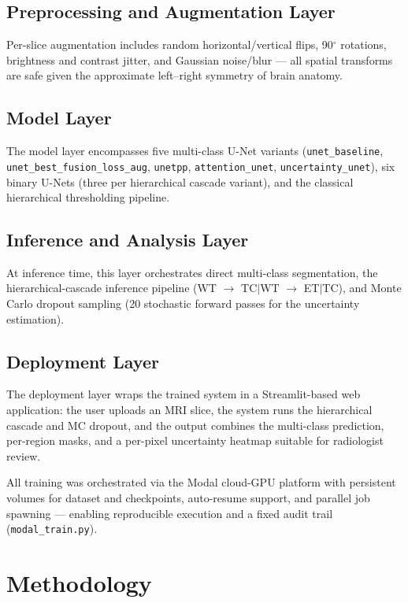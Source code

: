 \documentclass[conference]{IEEEtran}
\begin{document}
\subsection{Preprocessing and Augmentation Layer}
Per-slice augmentation includes random horizontal/vertical flips,
90$^\circ$ rotations, brightness and contrast jitter, and Gaussian
noise/blur --- all spatial transforms are safe given the approximate
left--right symmetry of brain anatomy.

\subsection{Model Layer}
The model layer encompasses five multi-class U-Net variants
(\texttt{unet\_baseline}, \texttt{unet\_best\_fusion\_loss\_aug},
\texttt{unetpp}, \texttt{attention\_unet}, \texttt{uncertainty\_unet}),
six binary U-Nets (three per hierarchical cascade variant), and the
classical hierarchical thresholding pipeline.

\subsection{Inference and Analysis Layer}
At inference time, this layer orchestrates direct multi-class
segmentation, the hierarchical-cascade inference pipeline
(WT $\to$ TC$|$WT $\to$ ET$|$TC), and Monte Carlo dropout sampling (20
stochastic forward passes for the uncertainty estimation).

\subsection{Deployment Layer}
The deployment layer wraps the trained system in a Streamlit-based web
application: the user uploads an MRI slice, the system runs the
hierarchical cascade and MC dropout, and the output combines the
multi-class prediction, per-region masks, and a per-pixel uncertainty
heatmap suitable for radiologist review.

All training was orchestrated via the Modal cloud-GPU platform with
persistent volumes for dataset and checkpoints, auto-resume support,
and parallel job spawning --- enabling reproducible execution and a
fixed audit trail (\texttt{modal\_train.py}).

\section{Methodology}
\label{sec:methodology}
\end{document}
